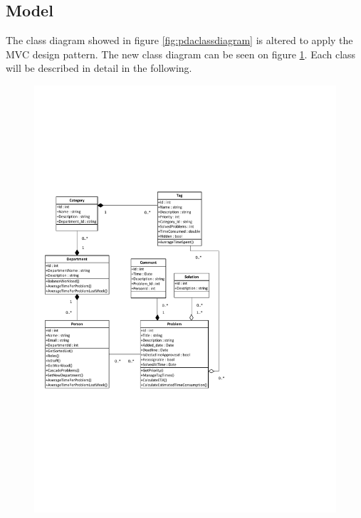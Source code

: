 \subsection{Model}
\label{sub:modelComponent}
The class diagram showed in figure \ref{fig:pdaclassdiagram} is altered to apply the MVC design pattern.
The new class diagram can be seen on figure \ref{fig:ClassDiagramV2}.
Each class will be described in detail in the following.
\begin{figure}[p]%
\includegraphics[clip=true, width=1.00\textwidth, trim=0.5cm 5cm 7.5cm 7cm]{input/component_design/ClassDiagramV2.pdf}%
%
\label{fig:ClassDiagramV2}%
\end{figure}

